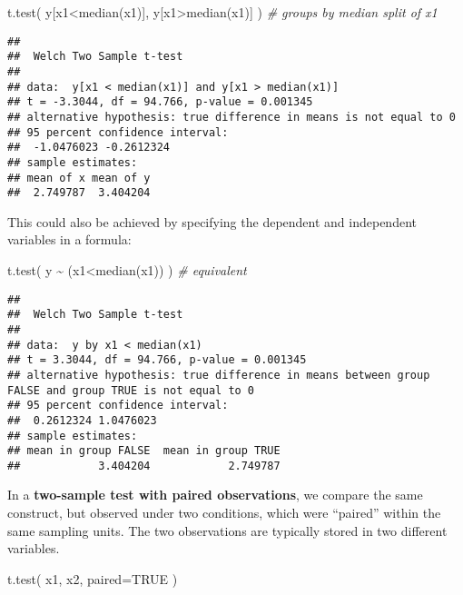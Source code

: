 \documentclass[
]{book}
\newenvironment{Shaded}{\begin{snugshade}}{\end{snugshade}}
\newcommand{\AttributeTok}[1]{\textcolor[rgb]{0.77,0.63,0.00}{#1}}
\newcommand{\CommentTok}[1]{\textcolor[rgb]{0.56,0.35,0.01}{\textit{#1}}}
\newcommand{\ConstantTok}[1]{\textcolor[rgb]{0.00,0.00,0.00}{#1}}
\newcommand{\FunctionTok}[1]{\textcolor[rgb]{0.00,0.00,0.00}{#1}}
\newcommand{\NormalTok}[1]{#1}
\newcommand{\SpecialCharTok}[1]{\textcolor[rgb]{0.00,0.00,0.00}{#1}}
\begin{document}
\begin{Shaded}
\begin{Highlighting}[]
\FunctionTok{t.test}\NormalTok{( y[x1}\SpecialCharTok{\textless{}}\FunctionTok{median}\NormalTok{(x1)], y[x1}\SpecialCharTok{\textgreater{}}\FunctionTok{median}\NormalTok{(x1)] ) }\CommentTok{\# groups by median split of x1}
\end{Highlighting}
\end{Shaded}

\begin{verbatim}
## 
##  Welch Two Sample t-test
## 
## data:  y[x1 < median(x1)] and y[x1 > median(x1)]
## t = -3.3044, df = 94.766, p-value = 0.001345
## alternative hypothesis: true difference in means is not equal to 0
## 95 percent confidence interval:
##  -1.0476023 -0.2612324
## sample estimates:
## mean of x mean of y 
##  2.749787  3.404204
\end{verbatim}

This could also be achieved by specifying the dependent and
independent variables in a formula:

\begin{Shaded}
\begin{Highlighting}[]
\FunctionTok{t.test}\NormalTok{( y }\SpecialCharTok{\textasciitilde{}}\NormalTok{ (x1}\SpecialCharTok{\textless{}}\FunctionTok{median}\NormalTok{(x1)) ) }\CommentTok{\# equivalent}
\end{Highlighting}
\end{Shaded}

\begin{verbatim}
## 
##  Welch Two Sample t-test
## 
## data:  y by x1 < median(x1)
## t = 3.3044, df = 94.766, p-value = 0.001345
## alternative hypothesis: true difference in means between group FALSE and group TRUE is not equal to 0
## 95 percent confidence interval:
##  0.2612324 1.0476023
## sample estimates:
## mean in group FALSE  mean in group TRUE 
##            3.404204            2.749787
\end{verbatim}

In a \textbf{two-sample test with paired observations}, we compare the same construct, but observed under two conditions, which were ``paired'' within the same sampling units. The two observations are typically stored in two different variables.

\begin{Shaded}
\begin{Highlighting}[]
\FunctionTok{t.test}\NormalTok{( x1, x2, }\AttributeTok{paired=}\ConstantTok{TRUE}\NormalTok{ )}
\end{Highlighting}
\end{Shaded}
\end{document}
